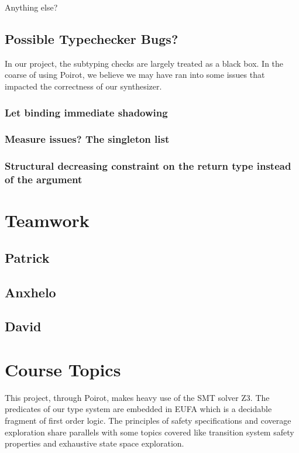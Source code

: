 \documentclass[review, sigplan]{acmart}
\begin{document}
Anything else?

\subsection{Possible Typechecker Bugs?}
In our project, the subtyping checks are largely treated as a black box. In the
coarse of using Poirot, we believe we may have ran into some issues that
impacted the correctness of our synthesizer.

\subsubsection{Let binding immediate shadowing}

\subsubsection{Measure issues? The singleton list}

\subsubsection{Structural decreasing constraint on the return type instead of the argument}

\section{Teamwork}

\subsection{Patrick}

\subsection{Anxhelo}

\subsection{David}

\section{Course Topics}
This project, through Poirot, makes heavy use of the SMT solver Z3. The
predicates of our type system are embedded in EUFA which is a decidable fragment
of first order logic. The principles of safety specifications and coverage
exploration share parallels with some topics covered like transition system
safety properties and exhaustive state space exploration.
\end{document}
